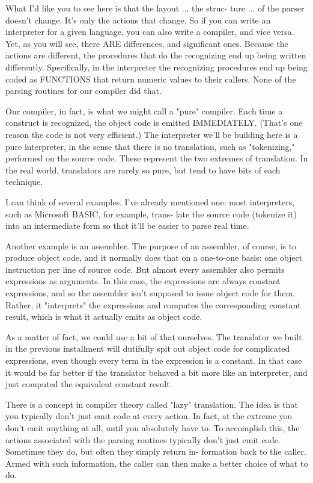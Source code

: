 \documentclass[float=false, crop=false]{standalone}
\begin{document}
What I'd like you to see here is that the layout ... the struc- ture ... of the
parser doesn't change. It's only the actions that change. So if you can write an
interpreter for a given language, you can also write a compiler, and vice versa.
Yet, as you will see, there ARE differences, and significant ones. Because the
actions are different, the procedures that do the recognizing end up being
written differently. Specifically, in the interpreter the recognizing procedures
end up being coded as FUNCTIONS that return numeric values to their callers.
None of the parsing routines for our compiler did that.

Our compiler, in fact, is what we might call a "pure" compiler. Each time a
construct is recognized, the object code is emitted IMMEDIATELY. (That's one
reason the code is not very efficient.) The interpreter we'll be building here
is a pure interpreter, in the sense that there is no translation, such as
"tokenizing," performed on the source code. These represent the two extremes of
translation. In the real world, translators are rarely so pure, but tend to have
bits of each technique.

I can think of several examples. I've already mentioned one: most interpreters,
such as Microsoft BASIC, for example, trans- late the source code (tokenize it)
into an intermediate form so that it'll be easier to parse real time.

Another example is an assembler. The purpose of an assembler, of course, is to
produce object code, and it normally does that on a one-to-one basis: one object
instruction per line of source code. But almost every assembler also permits
expressions as arguments. In this case, the expressions are always constant
expressions, and so the assembler isn't supposed to issue object code for them.
Rather, it "interprets" the expressions and computes the corresponding constant
result, which is what it actually emits as object code.

As a matter of fact, we could use a bit of that ourselves. The translator we
built in the previous installment will dutifully spit out object code for
complicated expressions, even though every term in the expression is a constant.
In that case it would be far better if the translator behaved a bit more like an
interpreter, and just computed the equivalent constant result.

There is a concept in compiler theory called "lazy" translation. The idea is
that you typically don't just emit code at every action. In fact, at the extreme
you don't emit anything at all, until you absolutely have to. To accomplish
this, the actions associated with the parsing routines typically don't just emit
code. Sometimes they do, but often they simply return in- formation back to the
caller. Armed with such information, the caller can then make a better choice of
what to do.
\end{document}
